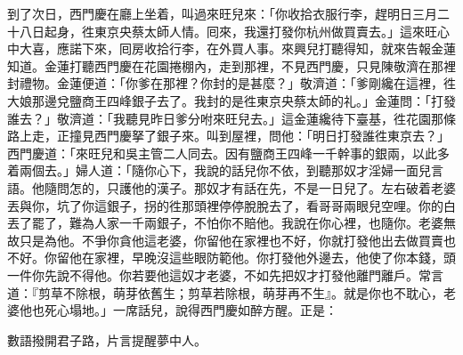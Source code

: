 到了次日，西門慶在廳上坐着，叫過來旺兒來：「你收拾衣服行李，趕明日三月二十八日起身，徃東京央蔡太師人情。囘來，我還打發你杭州做買賣去。」這來旺心中大喜，{}應諾下來，囘房收拾行李，在外買人事。來興兒打聽得知，就來告報金蓮知道。金蓮打聽西門慶在花園捲棚內，走到那裡，不見西門慶，只見陳敬濟在那裡封禮物。金蓮便道：「你爹在那裡？你封的是甚麼？」敬濟道：「爹剛纔在這裡，徃大娘那邊兌鹽商王四峰銀子去了。我封的是徃東京央蔡太師的礼。」金蓮問：「打發誰去？」敬濟道：「我聽見昨日爹分咐來旺兒去。」這金蓮纔待下臺基，徃花園那條路上走，正撞見西門慶拏了銀子來。叫到屋裡，問他：「明日打發誰徃東京去？」西門慶道：「來旺兒和吳主管二人同去。因有鹽商王四峰一千幹事的銀兩，以此多着兩個去。」婦人道：「隨你心下，我說的話兒你不依，到聽那奴才淫婦一面兒言語。他隨問怎的，只護他的漢子。那奴才有話在先，不是一日兒了。左右破着老婆丟與你，坑了你這銀子，拐的徃那頭裡停停脫脫去了，看哥哥兩眼兒空哩。你的白丟了罷了，難為人家一千兩銀子，不怕你不賠他。{}我說在你心裡，也隨你。老婆無故只是為他。不爭你貪他這老婆，你留他在家裡也不好，你就打發他出去做買賣也不好。你留他在家裡，早晚沒這些眼防範他。你打發他外邊去，他使了你本錢，頭一件你先說不得他。你若要他這奴才老婆，不如先把奴才打發他離門離戶。常言道：『剪草不除根，萌芽依舊生；剪草若除根，萌芽再不生』。就是你也不耽心，老婆他也死心塌地。」{}一席話兒，說得西門慶如醉方醒。正是：

數語撥開君子路，片言提醒夢中人。

